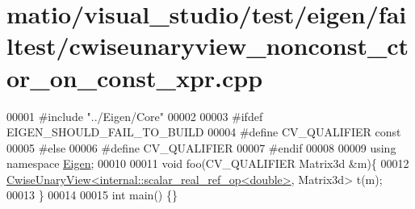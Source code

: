 \hypertarget{matio_2visual__studio_2test_2eigen_2failtest_2cwiseunaryview__nonconst__ctor__on__const__xpr_8cpp_source}{}\section{matio/visual\+\_\+studio/test/eigen/failtest/cwiseunaryview\+\_\+nonconst\+\_\+ctor\+\_\+on\+\_\+const\+\_\+xpr.cpp}
\label{matio_2visual__studio_2test_2eigen_2failtest_2cwiseunaryview__nonconst__ctor__on__const__xpr_8cpp_source}

\begin{DoxyCode}
00001 \textcolor{preprocessor}{#include "../Eigen/Core"}
00002 
00003 \textcolor{preprocessor}{#ifdef EIGEN\_SHOULD\_FAIL\_TO\_BUILD}
00004 \textcolor{preprocessor}{#define CV\_QUALIFIER const}
00005 \textcolor{preprocessor}{#else}
00006 \textcolor{preprocessor}{#define CV\_QUALIFIER}
00007 \textcolor{preprocessor}{#endif}
00008 
00009 \textcolor{keyword}{using namespace }\hyperlink{namespace_eigen}{Eigen};
00010 
00011 \textcolor{keywordtype}{void} foo(CV\_QUALIFIER Matrix3d &m)\{
00012     \hyperlink{group___core___module_class_eigen_1_1_cwise_unary_view}{CwiseUnaryView<internal::scalar\_real\_ref\_op<double>},
      Matrix3d> t(m);
00013 \}
00014 
00015 \textcolor{keywordtype}{int} main() \{\}
\end{DoxyCode}

